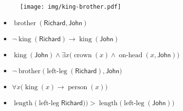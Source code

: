 \documentclass[UTF8,11pt,colorlinks,compress,openany]{beamer}%
\begin{document}
\begin{frame}\frametitle{}
\begin{figure}
\texttt{[image: img/king-brother.pdf]}
\end{figure}
\begin{itemize}
	\item $\operatorname{brother}(\textsf{Richard},\textsf{John})$
	\item $\neg\operatorname{king}(\textsf{Richard})\to \operatorname{king}(\textsf{John})$
	\item $\operatorname{king}(\textsf{John})\wedge\exists x\big(\operatorname{crown}(x)\wedge \operatorname{on-head}(x,\textsf{John})\big)$
	\item $\neg\operatorname{brother}\big(\operatorname{left-leg}(\textsf{Richard}),\textsf{John}\big)$
	\item $\forall x\big(\operatorname{king}(x)\to \operatorname{person}(x)\big)$
	\item $\operatorname{length}\big(\operatorname{left-leg}\textsf{Richard})\big)>\operatorname{length}\big(\operatorname{left-leg}(\textsf{John})\big)$
\end{itemize}
\end{frame}
\end{document}

